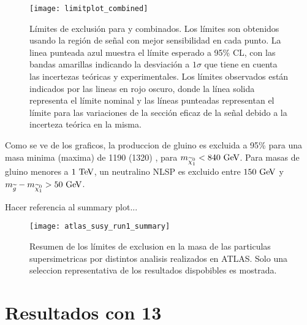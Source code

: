 \begin{figure}[!htbp]
  \centering

  \texttt{[image: limitplot\_combined]}

  \caption{Límites de exclusión para {\SRL} y {\SRH} combinados.
    Los límites son obtenidos usando la región de señal con mejor sensibilidad
    en cada punto.
    La linea punteada azul muestra el límite esperado a 95\% CL, con las bandas amarillas indicando la desviación a
    $1\sigma$ que tiene en cuenta las incertezas teóricas y experimentales. Los
    límites observados están indicados por las lineas en rojo oscuro, donde la línea
    solida representa el límite nominal y las líneas punteadas representan el límite
    para las variaciones de la sección eficaz de la señal debido a la incerteza
    teórica en la misma.}
   \label{fig:limit_combined}

\end{figure}


Como se ve de los graficos, la produccion de gluino es excluida a 95\% {\cl} para
una masa minima (maxima) de 1190 (1320) \gev, para $m_{\ninoone}<{840}\gev$.
Para masas de gluino menores a $1\tev$, un neutralino NLSP es excluido entre
$150\gev$ y $m_{\gluino}-m_{\ninoone}>50\gev$. 

Hacer referencia al summary plot...


\begin{figure}[!htbp]
  \centering

  \texttt{[image: atlas\_susy\_run1\_summary]}

  \caption{Resumen de los límites de exclusion en la masa de las particulas supersimetricas por distintos analisis realizados en ATLAS.
    Solo una seleccion representativa de los resultados dispobibles es mostrada\cite{susy_summary}.}
  \label{fig:susy_summary}

\end{figure}


\section{Resultados con 13 \tev}

